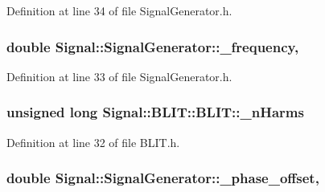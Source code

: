 Definition at line 34 of file Signal\+Generator.\+h.

\hypertarget{class_signal_1_1_signal_generator_a7f107461333bce68c5dad412db96a8c2}{
\subsubsection[{\+\_\+frequency}]{\setlength{\rightskip}{0pt plus 5cm}double Signal\+::\+Signal\+Generator\+::\+\_\+frequency\hspace{0.3cm}{\ttfamily [protected]}, {\ttfamily [inherited]}}}\label{class_signal_1_1_signal_generator_a7f107461333bce68c5dad412db96a8c2}


Definition at line 33 of file Signal\+Generator.\+h.

\hypertarget{class_signal_1_1_b_l_i_t_1_1_b_l_i_t_a0bfbf4e7515a42fab7df748b8497f648}{
\subsubsection[{\+\_\+n\+Harms}]{\setlength{\rightskip}{0pt plus 5cm}unsigned long Signal\+::\+B\+L\+I\+T\+::\+B\+L\+I\+T\+::\+\_\+n\+Harms\hspace{0.3cm}{\ttfamily [protected]}}}\label{class_signal_1_1_b_l_i_t_1_1_b_l_i_t_a0bfbf4e7515a42fab7df748b8497f648}


Definition at line 32 of file B\+L\+I\+T.\+h.

\hypertarget{class_signal_1_1_signal_generator_a6b4444d46747c8517171edbbf4b5588f}{
\subsubsection[{\+\_\+phase\+\_\+offset}]{\setlength{\rightskip}{0pt plus 5cm}double Signal\+::\+Signal\+Generator\+::\+\_\+phase\+\_\+offset\hspace{0.3cm}{\ttfamily [protected]}, {\ttfamily [inherited]}}}\label{class_signal_1_1_signal_generator_a6b4444d46747c8517171edbbf4b5588f}


